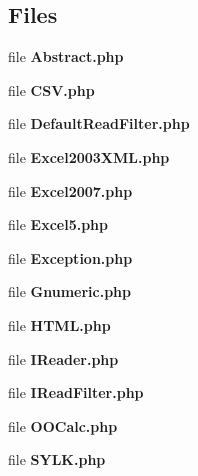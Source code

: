 \subsection*{Files}
\begin{DoxyCompactItemize}
\item 
file {\bfseries Abstract.\+php}
\item 
file {\bfseries C\+S\+V.\+php}
\item 
file {\bfseries Default\+Read\+Filter.\+php}
\item 
file {\bfseries Excel2003\+X\+M\+L.\+php}
\item 
file {\bfseries Excel2007.\+php}
\item 
file {\bfseries Excel5.\+php}
\item 
file {\bfseries Exception.\+php}
\item 
file {\bfseries Gnumeric.\+php}
\item 
file {\bfseries H\+T\+M\+L.\+php}
\item 
file {\bfseries I\+Reader.\+php}
\item 
file {\bfseries I\+Read\+Filter.\+php}
\item 
file {\bfseries O\+O\+Calc.\+php}
\item 
file {\bfseries S\+Y\+L\+K.\+php}
\end{DoxyCompactItemize}
